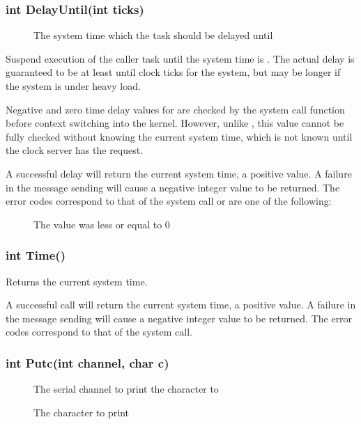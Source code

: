 \documentclass[pdftex,10pt,a4paper]{article}
\begin{document}
\subsubsection*{int DelayUntil(int ticks)}

\begin{description}
\item[] The system time which the task should be delayed
  until
\end{description}

Suspend execution of the caller task until the system time is .
The actual delay is guaranteed to be at least until 
clock ticks for the system, but may be longer if the system is under
heavy load.

Negative and zero time delay values for  are checked by the
system call function before context switching into the
kernel. However, unlike , this value cannot be fully
checked without knowing the current system time, which is not known
until the clock server has the request.

A successful delay will return the current system time, a positive
value. A failure in the message sending will cause a negative integer
value to be returned. The error codes correspond to that of the
 system call or are one of the following:

\begin{description}
\item[] The  value was less or
  equal to $0$
\end{description}


\subsubsection*{int Time()}

Returns the current system time.

A successful call will return the current system time, a positive
value. A failure in the message sending will cause a negative integer
value to be returned. The error codes correspond to that of the
 system call.


\subsubsection*{int Putc(int channel, char c)}

\begin{description}
\item[] The serial channel to print the character to
\item[] The character to print
\end{description}
\end{document}
